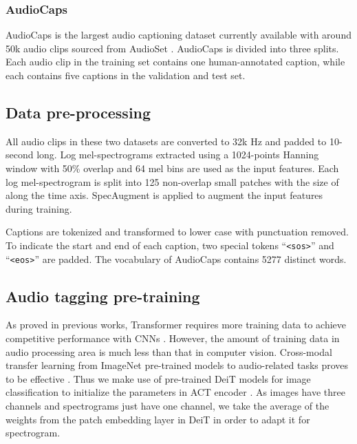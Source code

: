 \documentclass{article}
\begin{document}
\begin{sloppy}
\subsubsection{AudioCaps}
\label{ssec:audiocaps}
AudioCaps is the largest audio captioning dataset currently available with around 50k audio clips sourced from AudioSet \cite{kim2019audiocaps}. AudioCaps is divided into three splits. Each audio clip in the training set contains one human-annotated caption, while each contains five captions in the validation and test set. 


\subsection{Data pre-processing}
\label{ssec:dat_preprocess}
All audio clips in these two datasets are converted to 32k Hz and padded to 10-second long. Log mel-spectrograms extracted using a \num{1024}-points Hanning window with \num{50}\% overlap and \num{64} mel bins are used as the input features. Each log mel-spectrogram is split into \num{125} non-overlap small patches with the size of  along the time axis. SpecAugment \cite{park2019specaugment} is applied to augment the input features during training. 

Captions are tokenized and transformed to lower case with punctuation removed. To indicate the start and end of each caption, two special tokens ``\texttt{\textless sos\textgreater}'' and ``\texttt{\textless eos\textgreater}'' are padded. The vocabulary of AudioCaps contains \num{5277} distinct words.

\subsection{Audio tagging pre-training}
\label{ssec:pre_training}
As proved in previous works, Transformer requires more training data to achieve competitive performance with CNNs \cite{dosovitskiy2020image}. However, the amount of training data in audio processing area is much less than that in computer vision. Cross-modal transfer learning from ImageNet pre-trained models to audio-related tasks proves to be effective \cite{gong2021psla}. Thus we make use of pre-trained DeiT models for image classification to initialize the parameters in ACT encoder \cite{dosovitskiy2020image, touvron2021training}. As images have three channels and spectrograms just have one channel, we take the average of the weights from the patch embedding layer in DeiT in order to adapt it for spectrogram.


\end{sloppy}
\end{document}

